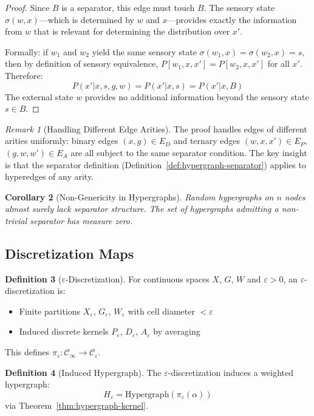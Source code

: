 \documentclass[11pt,a4paper]{article}
\theoremstyle{definition}
\newtheorem{definition}{Definition}[section]
\theoremstyle{plain}
\newtheorem{corollary}[definition]{Corollary}
\theoremstyle{remark}
\newtheorem{remark}[definition]{Remark}
\begin{document}
\begin{proof}
Since $B$ is a separator, this edge must touch $B$. The sensory state $\sigma(w, x)$---which is determined by $w$ and $x$---provides exactly the information from $w$ that is relevant for determining the distribution over $x'$.

Formally: if $w_1$ and $w_2$ yield the same sensory state $\sigma(w_1, x) = \sigma(w_2, x) = s$, then by definition of sensory equivalence, $P[w_1, x, x'] = P[w_2, x, x']$ for all $x'$. Therefore:
\[
P(x' | x, s, g, w) = P(x' | x, s) = P(x' | x, B)
\]
The external state $w$ provides no additional information beyond the sensory state $s \in B$.
\end{proof}

\begin{remark}[Handling Different Edge Arities]
The proof handles edges of different arities uniformly: binary edges $(x, g) \in E_D$ and ternary edges $(w, x, x') \in E_P$, $(g, w, w') \in E_A$ are all subject to the same separator condition. The key insight is that the separator definition (Definition~\ref{def:hypergraph-separator}) applies to hyperedges of any arity.
\end{remark}

\begin{corollary}[Non-Genericity in Hypergraphs]
Random hypergraphs on $n$ nodes almost surely lack separator structure. The set of hypergraphs admitting a non-trivial separator has measure zero.
\end{corollary}

\subsection{Discretization Maps}

\begin{definition}[$\varepsilon$-Discretization]
For continuous spaces $X$, $G$, $W$ and $\varepsilon > 0$, an $\varepsilon$-discretization is:
\begin{itemize}
    \item Finite partitions $X_\varepsilon$, $G_\varepsilon$, $W_\varepsilon$ with cell diameter $< \varepsilon$
    \item Induced discrete kernels $P_\varepsilon$, $D_\varepsilon$, $A_\varepsilon$ by averaging
\end{itemize}
This defines $\pi_\varepsilon: \mathcal{C}_\infty \to \mathcal{C}_\varepsilon$.
\end{definition}

\begin{definition}[Induced Hypergraph]
The $\varepsilon$-discretization induces a weighted hypergraph:
\[
H_\varepsilon = \text{Hypergraph}(\pi_\varepsilon(\alpha))
\]
via Theorem~\ref{thm:hypergraph-kernel}.
\end{definition}
\end{document}
